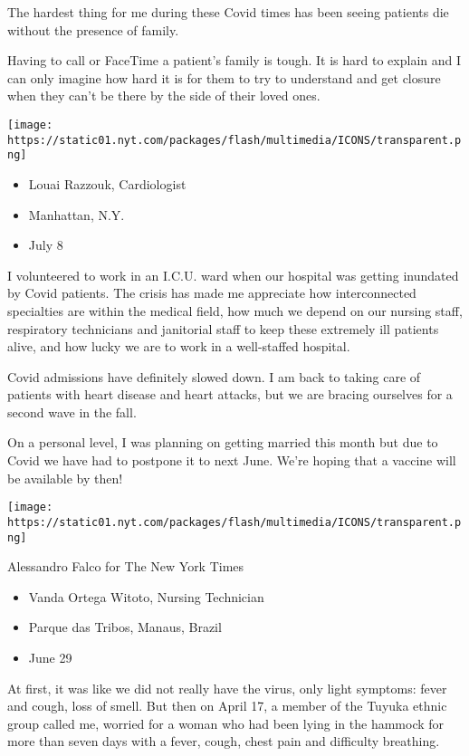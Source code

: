 The hardest thing for me during these Covid times has been seeing
patients die without the presence of family.

Having to call or FaceTime a patient's family is tough. It is hard to
explain and I can only imagine how hard it is for them to try to
understand and get closure when they can't be there by the side of their
loved ones.

\texttt{[image: https://static01.nyt.com/packages/flash/multimedia/ICONS/transparent.png]}

\begin{itemize}
\tightlist
\item
  Louai Razzouk, Cardiologist
\item
  Manhattan, N.Y.
\item
  July 8
\end{itemize}

I volunteered to work in an I.C.U. ward when our hospital was getting
inundated by Covid patients. The crisis has made me appreciate how
interconnected specialties are within the medical field, how much we
depend on our nursing staff, respiratory technicians and janitorial
staff to keep these extremely ill patients alive, and how lucky we are
to work in a well-staffed hospital.

Covid admissions have definitely slowed down. I am back to taking care
of patients with heart disease and heart attacks, but we are bracing
ourselves for a second wave in the fall.

On a personal level, I was planning on getting married this month but
due to Covid we have had to postpone it to next June. We're hoping that
a vaccine will be available by then!

\texttt{[image: https://static01.nyt.com/packages/flash/multimedia/ICONS/transparent.png]}

Alessandro Falco for The New York Times

\begin{itemize}
\tightlist
\item
  Vanda Ortega Witoto, Nursing Technician
\item
  Parque das Tribos, Manaus, Brazil
\item
  June 29
\end{itemize}

At first, it was like we did not really have the virus, only light
symptoms: fever and cough, loss of smell. But then on April 17, a member
of the Tuyuka ethnic group called me, worried for a woman who had been
lying in the hammock for more than seven days with a fever, cough, chest
pain and difficulty breathing.

